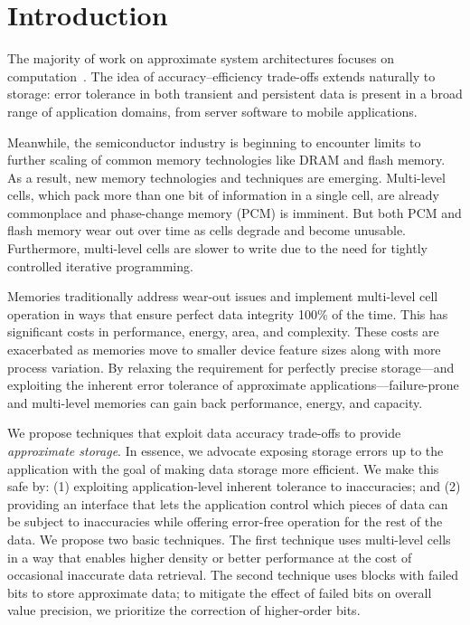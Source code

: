 

\section{Introduction}
\label{approxstorage:sec:intro}

The majority of work on approximate system architectures focuses on
computation~\cite{enerj,truffle,pcmos,stochasticproc,relax,ersa}.
The idea of accuracy--efficiency trade-offs extends naturally to
storage: error tolerance in both transient and persistent data is
present in a broad range of application domains, from server software to
mobile applications.

Meanwhile, the semiconductor industry is beginning to encounter limits to
further scaling of common memory technologies like DRAM and flash memory. As a
result, new memory technologies and techniques are emerging. Multi-level cells,
which pack more than one bit of information in a single cell,
are already commonplace and phase-change memory (PCM) is imminent.
But both
PCM and flash memory wear out over time as cells degrade and become unusable. Furthermore, multi-level cells
are slower to write due to the need for tightly
controlled iterative programming.

Memories traditionally address wear-out issues and implement multi-level cell
operation in ways that ensure perfect data integrity 100\% of the time. This
has significant costs in performance, energy, area, and complexity. These
costs are exacerbated as memories move to smaller device feature sizes along
with more process variation. By relaxing the requirement for perfectly precise
storage---and exploiting the inherent error tolerance of approximate
applications---failure-prone and multi-level memories can gain back
performance, energy, and capacity.

We propose techniques that exploit data accuracy trade-offs to
provide \emph{approximate storage}. In essence, we advocate exposing storage
errors up to the application with the goal of making data storage more
efficient. We make this safe by: (1) exploiting application-level inherent
tolerance to inaccuracies; and (2) providing an interface that lets the
application control which pieces of data can be subject to inaccuracies while offering error-free operation for the rest of the data.
We propose two basic techniques. The first
technique uses multi-level cells in a way that enables higher density or
better performance at the cost of occasional inaccurate data retrieval. The
second technique uses blocks with failed bits to store approximate data; to
mitigate the effect of failed bits on overall value precision, we prioritize
the correction of higher-order bits.

